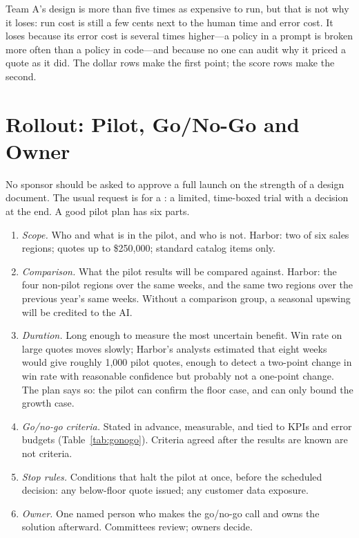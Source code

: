 Team A's design is more than five times as expensive to run, but that is not why it loses: run cost is still a few cents next to the human time and error cost. It loses because its error cost is several times higher---a policy in a prompt is broken more often than a policy in code---and because no one can audit why it priced a quote as it did. The dollar rows make the first point; the score rows make the second.

\section{Rollout: Pilot, Go/No-Go and Owner}
\label{sec:rollout}

No sponsor should be asked to approve a full launch on the strength of a design document. The usual request is for a : a limited, time-boxed trial with a decision at the end. A good pilot plan has six parts.

\begin{enumerate}[itemsep=2pt]
  \item \emph{Scope.} Who and what is in the pilot, and who is not. Harbor: two of six sales regions; quotes up to \$250{,}000; standard catalog items only.
  \item \emph{Comparison.} What the pilot results will be compared against. Harbor: the four non-pilot regions over the same weeks, and the same two regions over the previous year's same weeks. Without a comparison group, a seasonal upswing will be credited to the AI.
  \item \emph{Duration.} Long enough to measure the most uncertain benefit. Win rate on large quotes moves slowly; Harbor's analysts estimated that eight weeks would give roughly 1{,}000 pilot quotes, enough to detect a two-point change in win rate with reasonable confidence but probably not a one-point change. The plan says so: the pilot can confirm the floor case, and can only bound the growth case.
  \item \emph{Go/no-go criteria.} Stated in advance, measurable, and tied to KPIs and error budgets (Table~\ref{tab:gonogo}). Criteria agreed after the results are known are not criteria.
  \item \emph{Stop rules.} Conditions that halt the pilot at once, before the scheduled decision: any below-floor quote issued; any customer data exposure.
  \item \emph{Owner.} One named person who makes the go/no-go call and owns the solution afterward. Committees review; owners decide.
\end{enumerate}

